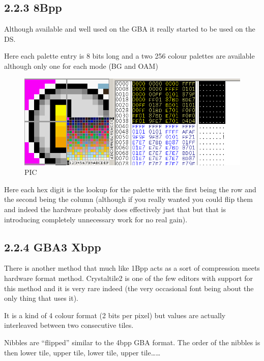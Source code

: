 \documentclass[
]{book}
\begin{document}
\hypertarget{bpp-2}{%
\subsection{2.2.3 8Bpp}\label{bpp-2}}

Although available and well used on the GBA it really started to be used on the DS.

Here each palette entry is 8 bits long and a two 256 colour palettes are available although only one for each mode (BG and OAM)

\begin{figure}
\centering
\includegraphics{images/22_home_fast6191_romhackingguide_unrenamed_file___inal_borders_romhackingguide8bpppalettedemo.png}
\caption{PIC}
\end{figure}

Here each hex digit is the lookup for the palette with the first being the row and the second being the column (although if you really wanted you could flip them and indeed the hardware probably does effectively just that but that is introducing completely unnecessary work for no real gain).

\hypertarget{gba3-xbpp}{%
\subsection{2.2.4 GBA3 Xbpp}\label{gba3-xbpp}}

There is another method that much like 1Bpp acts as a sort of compression meets hardware format method. Crystaltile2 is one of the few editors with support for this method and it is very rare indeed (the very occasional font being about the only thing that uses it).

It is a kind of 4 colour format (2 bits per pixel) but values are actually interleaved between two consecutive tiles.

Nibbles are ``flipped'' similar to the 4bpp GBA format. The order of the nibbles is then lower tile, upper tile, lower tile, upper tile\ldots\ldots{}
\end{document}
